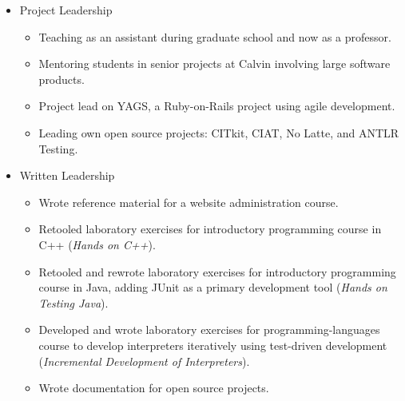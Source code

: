 \documentclass[letterpaper,10pt]{article}
\begin{document}
\begin{itemize}

	\item Project Leadership 
	\begin{itemize}
		\item Teaching as an assistant during graduate school and now as a professor. 
		\item Mentoring students in senior projects at Calvin involving large software products.
		\item Project lead on YAGS, a Ruby-on-Rails project using agile development.
		\item Leading own open source projects: CITkit, CIAT, No Latte, and ANTLR Testing.
	\end{itemize}

	\item Written Leadership
	  \begin{itemize}
	  	\item Wrote reference material for a website administration course.
	 		\item Retooled laboratory exercises for introductory programming course in C++ (\textit{Hands on C++}).
	 		\item Retooled and rewrote laboratory exercises for introductory programming course in Java, adding JUnit as a primary development tool (\textit{Hands on Testing Java}).
			\item Developed and wrote laboratory exercises for programming-languages course to develop interpreters iteratively using test-driven development (\textit{Incremental Development of Interpreters}).
			\item Wrote documentation for open source projects.
	  \end{itemize}

\end{itemize}
\end{document}
